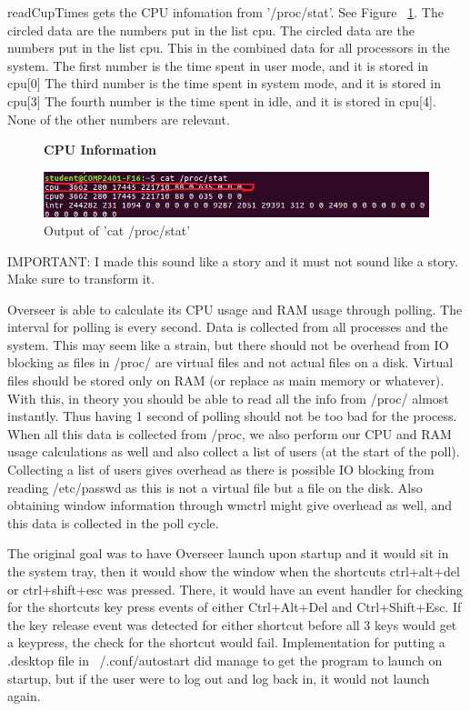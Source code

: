 \documentclass[12pt]{article}
\begin{document}
readCupTimes gets the CPU infomation from '/proc/stat'.
See Figure ~\ref{figCPUInfo}.
The circled data are the numbers put in the list cpu.
The circled data are the numbers put in the list cpu.
This in the combined data for all processors in the system.
The first number is the time spent in user mode, and it is stored in cpu[0]
The third number is the time spent in system mode, and it is stored in cpu[3]
The fourth number is the time spent in idle, and it is stored in cpu[4].
None of the other numbers are relevant.
\begin{figure}[here]
	\centering
	\textbf{CPU Information}\par\medskip
	\includegraphics{totalCPU}
	\caption{Output of 'cat /proc/stat'}
	\label{figCPUInfo}
\end{figure}

IMPORTANT: I made this sound like a story and it must not sound like a story. Make sure to transform it.

Overseer is able to calculate its CPU usage and RAM usage through polling.
The interval for polling is every second.
Data is collected from all processes and the system.
This may seem like a strain, but there should not be overhead from IO blocking as files in /proc/ are virtual files and not actual files on a disk. Virtual files should be stored only on RAM (or replace as main memory or whatever).
With this, in theory you should be able to read all the info from /proc/ almost instantly.
Thus having 1 second of polling should not be too bad for the process.
When all this data is collected from /proc, we also perform our CPU and RAM usage calculations as well and also collect a list of users (at the start of the poll).
Collecting a list of users gives overhead as there is possible IO blocking from reading /etc/passwd as this is not a virtual file but a file on the disk.
Also obtaining window information through wmctrl might give overhead as well, and this data is collected in the poll cycle.

The original goal was to have Overseer launch upon startup and it would sit in the system tray, then it would show the window when the shortcuts ctrl+alt+del or ctrl+shift+esc was pressed.
There, it would have an event handler for checking for the shortcuts key press events of either Ctrl+Alt+Del and Ctrl+Shift+Esc.
If the key release event was detected for either shortcut before all 3 keys would get a keypress, the check for the shortcut would fail.
Implementation for putting a .desktop file in ~/.conf/autostart did manage to get the program to launch on startup, but if the user were to log out and log back in, it would not launch again.
\end{document}
